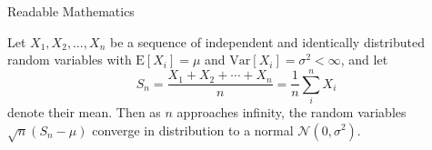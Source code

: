 \documentclass{beamer}
\begin{document}
    \begin{frame}{Readable Mathematics}
    
    Let $X_1, X_2, \ldots, X_n$ be a sequence of independent and identically distributed random variables with $\text{E}[X_i] = \mu$ and $\text{Var}[X_i] = \sigma^2 < \infty$, and let
    $$S_n = \frac{X_1 + X_2 + \cdots + X_n}{n}
            = \frac{1}{n}\sum_{i}^{n} X_i$$
    denote their mean. Then as $n$ approaches infinity, the random variables $\sqrt{n}(S_n - \mu)$ converge in distribution to a normal $\mathcal{N}(0, \sigma^2)$.
    
    \end{frame}
    
    
\end{document}
